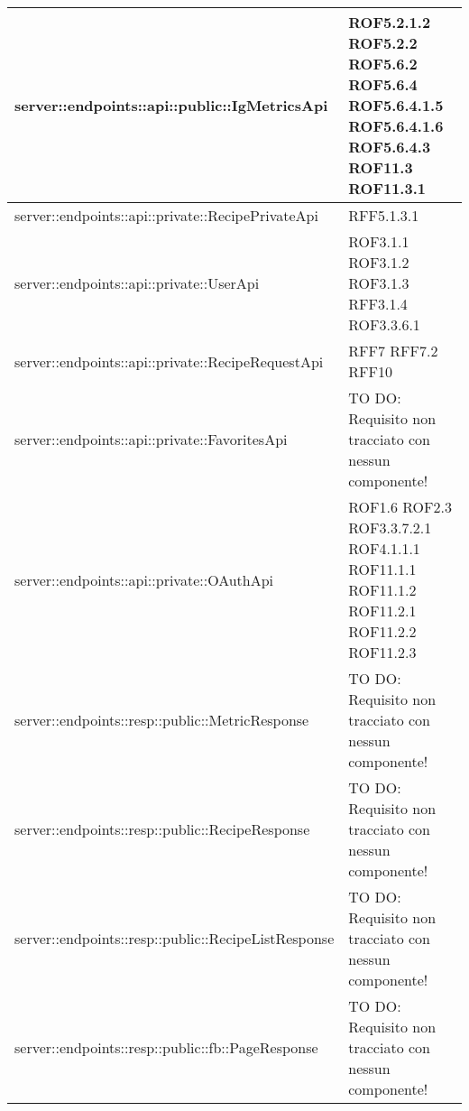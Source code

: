 \begin{center}
\begin{longtable}{| p{11cm} | p{2.5cm} |}
\hline
server::endpoints::api::public::IgMetricsApi & ROF5.2.1.2 \newline ROF5.2.2 \newline ROF5.6.2 \newline ROF5.6.4 \newline ROF5.6.4.1.5 \newline ROF5.6.4.1.6 \newline ROF5.6.4.3 \newline ROF11.3 \newline ROF11.3.1 \\
\hline
server::endpoints::api::private::RecipePrivateApi & RFF5.1.3.1 \\
\hline
server::endpoints::api::private::UserApi & ROF3.1.1 \newline ROF3.1.2 \newline ROF3.1.3 \newline RFF3.1.4 \newline ROF3.3.6.1 \\
\hline
server::endpoints::api::private::RecipeRequestApi & RFF7 \newline RFF7.2 \newline RFF10 \\
\hline
server::endpoints::api::private::FavoritesApi & TO DO: Requisito non tracciato con nessun componente! \\
\hline
server::endpoints::api::private::OAuthApi & ROF1.6 \newline ROF2.3 \newline ROF3.3.7.2.1 \newline ROF4.1.1.1 \newline ROF11.1.1 \newline ROF11.1.2 \newline ROF11.2.1 \newline ROF11.2.2 \newline ROF11.2.3 \\
\hline
server::endpoints::resp::public::MetricResponse & TO DO: Requisito non tracciato con nessun componente! \\
\hline
server::endpoints::resp::public::RecipeResponse & TO DO: Requisito non tracciato con nessun componente! \\
\hline
server::endpoints::resp::public::RecipeListResponse & TO DO: Requisito non tracciato con nessun componente! \\
\hline
server::endpoints::resp::public::fb::PageResponse & TO DO: Requisito non tracciato con nessun componente! \\
\hline

\end{longtable}
\end{center}
